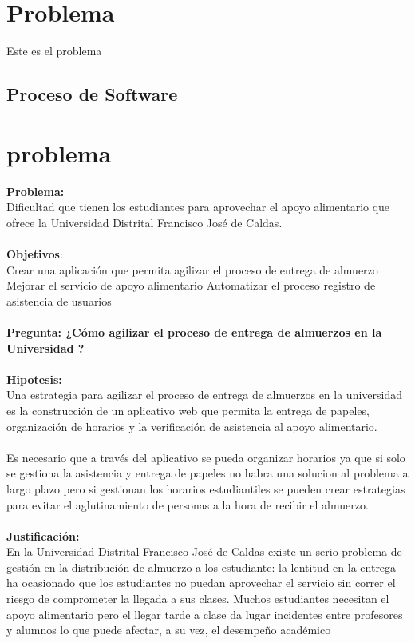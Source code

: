 \chapter{Problema}
Este es el problema \cite{Bol_2012,Bol_2016}

\section{Proceso de Software}

\chapter{problema}
\textbf{Problema:}
\\
Dificultad que tienen los estudiantes para aprovechar el apoyo alimentario que ofrece la Universidad Distrital Francisco José de Caldas. 
\\
\\
\textbf{Objetivos}:
\\
Crear una aplicación que permita agilizar el proceso de entrega de almuerzo
Mejorar el servicio de apoyo alimentario 
Automatizar el proceso registro de asistencia de usuarios
\\
\\
\textbf{Pregunta: ¿Cómo agilizar el proceso de entrega de almuerzos en la Universidad ?}
\\
\\
\textbf{Hipotesis:} 
\\
Una estrategia para agilizar el proceso de entrega de almuerzos en la universidad es la construcción de un aplicativo web que permita la entrega de papeles, organización de horarios y la verificación de asistencia al apoyo alimentario.
\\
\\
Es necesario que a través del aplicativo se pueda organizar horarios ya que si solo se gestiona la asistencia y entrega de papeles no habra una solucion al problema a largo plazo pero si gestionan los horarios estudiantiles se pueden crear estrategias para evitar el aglutinamiento de personas a la hora de recibir el almuerzo.
\\
\\
\textbf{Justificación:}
\\ 
En la Universidad Distrital Francisco José de Caldas existe un serio problema de gestión en la distribución de almuerzo a los estudiante:  la lentitud en la entrega ha ocasionado que los estudiantes no puedan aprovechar el servicio sin correr el riesgo de comprometer la llegada a sus clases. Muchos estudiantes necesitan el apoyo alimentario pero el llegar tarde a clase da lugar incidentes entre profesores y alumnos lo que  puede afectar, a su vez, el desempeño académico




        
